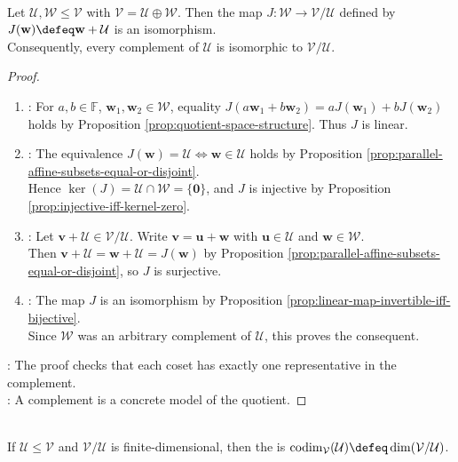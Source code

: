 \begin{proposition} \label{prop:quotient-by-complement-is-complement} \\
Let $\mathcal{U},\mathcal{W}\leq\mathcal{V}$ with $\mathcal{V}=\mathcal{U}\oplus\mathcal{W}$. Then the map $J:\mathcal{W}\to\mathcal{V}/\mathcal{U}$ defined by $J(\mathbf{w})\defeq\mathbf{w}+\mathcal{U}$ is an isomorphism.\\
Consequently, every complement of $\mathcal{U}$ is isomorphic to $\mathcal{V}/\mathcal{U}$.
\begin{proof}
\begin{enumerate}[label=(\roman*)]
\setlength{\itemsep}{0pt}
\item {}: For $a,b\in\mathbb{F}$, $\mathbf{w}_1,\mathbf{w}_2\in\mathcal{W}$, equality $J(a\mathbf{w}_1+b\mathbf{w}_2)=aJ(\mathbf{w}_1)+bJ(\mathbf{w}_2)$ holds by Proposition \ref{prop:quotient-space-structure}. Thus $J$ is linear.
\item {}: The equivalence $J(\mathbf{w})=\mathcal{U}\Leftrightarrow\mathbf{w}\in\mathcal{U}$ holds by Proposition \ref{prop:parallel-affine-subsets-equal-or-disjoint}.\\
Hence $\ker(J)=\mathcal{U}\cap\mathcal{W}=\{\mathbf{0}\}$, and $J$ is injective by Proposition \ref{prop:injective-iff-kernel-zero}.
\item {}: Let $\mathbf{v}+\mathcal{U}\in\mathcal{V}/\mathcal{U}$. Write $\mathbf{v}=\mathbf{u}+\mathbf{w}$ with $\mathbf{u}\in\mathcal{U}$ and $\mathbf{w}\in\mathcal{W}$.\\
Then $\mathbf{v}+\mathcal{U}=\mathbf{w}+\mathcal{U}=J(\mathbf{w})$ by Proposition \ref{prop:parallel-affine-subsets-equal-or-disjoint}, so $J$ is surjective.
\item {}: The map $J$ is an isomorphism by Proposition \ref{prop:linear-map-invertible-iff-bijective}.\\
Since $\mathcal{W}$ was an arbitrary complement of $\mathcal{U}$, this proves the consequent.
\end{enumerate}
: The proof checks that each coset has exactly one representative in the complement.\\
: A complement is a concrete model of the quotient.
\end{proof}
\end{proposition}

\begin{definition} \label{def:codimension-subspace} \\
If $\mathcal{U}\leq\mathcal{V}$ and $\mathcal{V}/\mathcal{U}$ is finite-dimensional, then the  is $\operatorname{codim}_{\mathcal{V}}(\mathcal{U})\defeq\dim(\mathcal{V}/\mathcal{U})$.
\end{definition}

